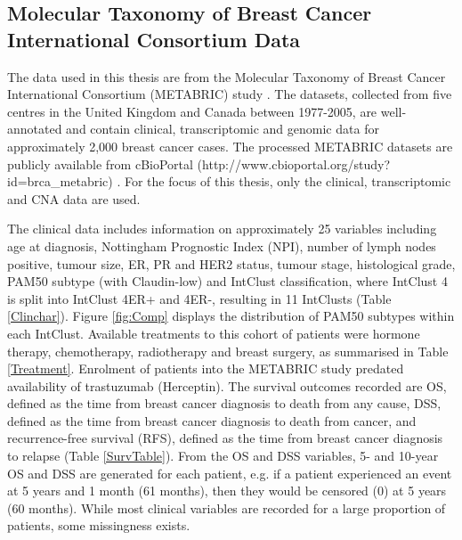 \subsection{Molecular Taxonomy of Breast Cancer International Consortium Data} 
The data used in this thesis are from the Molecular Taxonomy of Breast Cancer International Consortium (METABRIC) study \citep{pmid22522925}. The datasets, collected from five centres in the United Kingdom and Canada between 1977-2005, are well-annotated and contain clinical, transcriptomic and genomic data for approximately 2,000 breast cancer cases. The processed METABRIC datasets are publicly available from cBioPortal (http://www.cbioportal.org/study?id=brca\_metabric) \citep{pmid22588877, pmid23550210}. For the focus of this thesis, only the clinical, transcriptomic and CNA data are used.   

The clinical data includes information on approximately 25 variables including age at diagnosis, Nottingham Prognostic Index (NPI), number of lymph nodes positive, tumour size, ER, PR and HER2 status, tumour stage, histological grade, PAM50 subtype (with Claudin-low) and IntClust classification, where IntClust 4 is split into IntClust 4ER+ and 4ER-, resulting in 11 IntClusts (Table \ref{Clinchar}). Figure \ref{fig:Comp} displays the distribution of PAM50 subtypes within each IntClust. Available treatments to this cohort of patients were hormone therapy, chemotherapy, radiotherapy and breast surgery, as summarised in Table \ref{Treatment}. Enrolment of patients into the METABRIC study predated availability of trastuzumab (Herceptin). The survival outcomes recorded are OS, defined as the time from breast cancer diagnosis to death from any cause, DSS, defined as the time from breast cancer diagnosis to death from cancer, and recurrence-free survival (RFS), defined as the time from breast cancer diagnosis to relapse (Table \ref{SurvTable}). From the OS and DSS variables, 5- and 10-year OS and DSS are generated for each patient, e.g. if a patient experienced an event at 5 years and 1 month (61 months), then they would be censored (0) at 5 years (60 months). While most clinical variables are recorded for a large proportion of patients, some missingness exists.    

